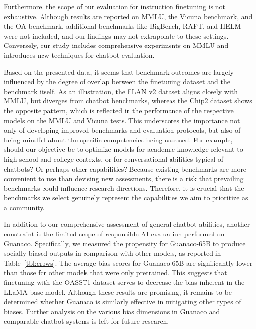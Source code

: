 Furthermore, the scope of our evaluation for instruction finetuning is not exhaustive. Although results are reported on MMLU, the Vicuna benchmark, and the OA benchmark, additional benchmarks like BigBench, RAFT, and HELM were not included, and our findings may not extrapolate to these settings. Conversely, our study includes comprehensive experiments on MMLU and introduces new techniques for chatbot evaluation.

Based on the presented data, it seems that benchmark outcomes are largely influenced by the degree of overlap between the finetuning dataset and the benchmark itself. As an illustration, the FLAN v2 dataset aligns closely with MMLU, but diverges from chatbot benchmarks, whereas the Chip2 dataset shows the opposite pattern, which is reflected in the performance of the respective models on the MMLU and Vicuna tests. This underscores the importance not only of developing improved benchmarks and evaluation protocols, but also of being mindful about the specific competencies being assessed. For example, should our objective be to optimize models for academic knowledge relevant to high school and college contexts, or for conversational abilities typical of chatbots? Or perhaps other capabilities? Because existing benchmarks are more convenient to use than devising new assessments, there is a risk that prevailing benchmarks could influence research directions. Therefore, it is crucial that the benchmarks we select genuinely represent the capabilities we aim to prioritize as a community.

In addition to our comprehensive assessment of general chatbot abilities, another constraint is the limited scope of responsible AI evaluation performed on {Guanaco}. Specifically, we measured the propensity for {Guanaco}-65B to produce socially biased outputs in comparison with other models, as reported in Table~\ref{tbl:crows}. The average bias scores for {Guanaco}-65B are significantly lower than those for other models that were only pretrained. This suggests that finetuning with the OASST1 dataset serves to decrease the bias inherent in the LLaMA base model. Although these results are promising, it remains to be determined whether {Guanaco} is similarly effective in mitigating other types of biases. Further analysis on the various bias dimensions in {Guanaco} and comparable chatbot systems is left for future research.

